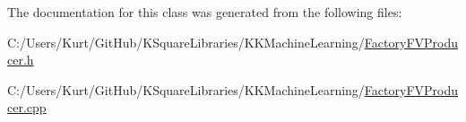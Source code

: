 The documentation for this class was generated from the following files\+:\begin{DoxyCompactItemize}
\item 
C\+:/\+Users/\+Kurt/\+Git\+Hub/\+K\+Square\+Libraries/\+K\+K\+Machine\+Learning/\hyperlink{_factory_f_v_producer_8h}{Factory\+F\+V\+Producer.\+h}\item 
C\+:/\+Users/\+Kurt/\+Git\+Hub/\+K\+Square\+Libraries/\+K\+K\+Machine\+Learning/\hyperlink{_factory_f_v_producer_8cpp}{Factory\+F\+V\+Producer.\+cpp}\end{DoxyCompactItemize}
